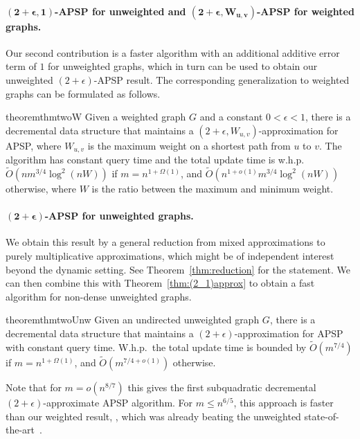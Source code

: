\paragraph{$\mathbf{(2+\epsilon, 1)}$-APSP for unweighted and $\mathbf{(2+\epsilon, W_{u,v})}$-APSP for weighted graphs.} 
Our second contribution is a faster algorithm with an additional additive error term of $1$ for unweighted graphs, which in turn can be used to obtain our unweighted $(2+\epsilon)$-APSP result.
The corresponding generalization to weighted graphs can be formulated as follows.

\begin{restatable}{theorem}{thmtwoW}\label{thm:(2_1)approx}
    Given a weighted graph $G$ and a constant $0 < \epsilon < 1$, there is a decremental data structure that maintains a $(2+\epsilon,W_{u,v})$-approximation for APSP, where $W_{u,v}$ is the maximum weight on a shortest path from $u$ to $v$. The algorithm has constant query time and the total update time is w.h.p.~$\tilde O( nm^{3/4}\log^2(nW))$ if $m=n^{1+\Omega(1)}$, and $\tilde O( n^{1+o(1)}m^{3/4}\log^2(nW))$ otherwise, where $W$ is the ratio between the maximum and minimum weight. 
\end{restatable}

\paragraph{$\mathbf{(2+\epsilon)}$-APSP for unweighted graphs.}
We obtain this result by a general reduction from mixed approximations to purely multiplicative approximations, which might be of independent interest beyond the dynamic setting. See Theorem~\ref{thm:reduction} for the statement. We can then combine this with Theorem~\ref{thm:(2_1)approx} to obtain a fast algorithm for non-dense unweighted graphs. 

\begin{restatable}{theorem}{thmtwoUnw}\label{thm:unweighted_2}
    Given an undirected unweighted graph $G$, there is a decremental data structure that maintains a $(2+\epsilon)$-approximation for APSP with constant query time. W.h.p.\ the total update time is bounded by $\tilde O( m^{7/4})$ if $m=n^{1+\Omega(1)}$, and $\tilde O( m^{7/4+o(1)})$ otherwise.
\end{restatable}

Note that for $m=o(n^{8/7})$ this gives the first subquadratic decremental $(2+\epsilon)$-approximate APSP algorithm. 
For $m\leq n^{6/5}$, this approach is faster than our weighted result, , which was already beating the unweighted state-of-the-art~\cite{AbrahamC13,HKN2016}. 


